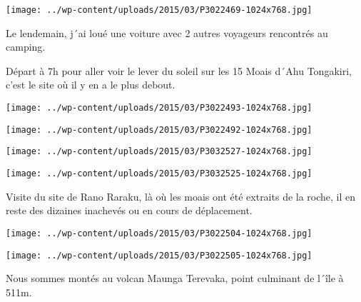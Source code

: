  

\begin{center} \texttt{[image: ../wp-content/uploads/2015/03/P3022469-1024x768.jpg]} \end{center}



 Le lendemain, j´ai loué une voiture avec 2 autres voyageurs rencontrés au camping.

 Départ à 7h pour aller voir le lever du soleil sur les 15 Moais d´Ahu Tongakiri, c'est le site où il y en a le plus debout.

 

\begin{center} \texttt{[image: ../wp-content/uploads/2015/03/P3022493-1024x768.jpg]} \end{center}

 

\begin{center} \texttt{[image: ../wp-content/uploads/2015/03/P3022492-1024x768.jpg]} \end{center}



 

\begin{center} \texttt{[image: ../wp-content/uploads/2015/03/P3032527-1024x768.jpg]} \end{center}

 

\begin{center} \texttt{[image: ../wp-content/uploads/2015/03/P3032525-1024x768.jpg]} \end{center}

Visite du site de Rano Raraku, là où les moais ont été extraits de la roche, il en reste des dizaines inachevés ou en cours de déplacement.

 

\begin{center} \texttt{[image: ../wp-content/uploads/2015/03/P3022504-1024x768.jpg]} \end{center}

 

\begin{center} \texttt{[image: ../wp-content/uploads/2015/03/P3022505-1024x768.jpg]} \end{center}



 Nous sommes montés au volcan Maunga Terevaka, point culminant de l´île à 511m.


